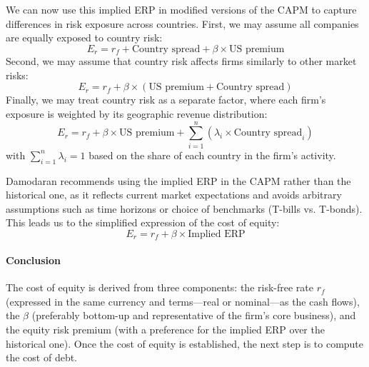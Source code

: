 We can now use this implied ERP in modified versions of the CAPM to capture differences in risk exposure across countries. First, we may assume all companies are equally exposed to country risk:
\begin{equation}
    E_r = r_f + \text{Country spread} + \beta \times \text{US premium}
\end{equation}
Second, we may assume that country risk affects firms similarly to other market risks:
\begin{equation}
    E_r = r_f + \beta \times (\text{US premium} + \text{Country spread})
\end{equation}
Finally, we may treat country risk as a separate factor, where each firm’s exposure is weighted by its geographic revenue distribution:
\begin{equation}
    E_r = r_f + \beta \times \text{US premium} + \sum_{i=1}^n(\lambda_i \times \text{Country spread}_i)
\end{equation}
with $\sum_{i=1}^n \lambda_i = 1$ based on the share of each country in the firm’s activity.

Damodaran recommends using the implied ERP in the CAPM rather than the historical one, as it reflects current market expectations and avoids arbitrary assumptions such as time horizons or choice of benchmarks (T-bills vs. T-bonds). This leads us to the simplified expression of the cost of equity:
\begin{equation}
    E_r = r_f + \beta \times \text{Implied ERP}
\end{equation}

\paragraph{Conclusion}

The cost of equity is derived from three components: the risk-free rate $r_f$ (expressed in the same currency and terms—real or nominal—as the cash flows), the $\beta$ (preferably bottom-up and representative of the firm’s core business), and the equity risk premium (with a preference for the implied ERP over the historical one). Once the cost of equity is established, the next step is to compute the cost of debt.









